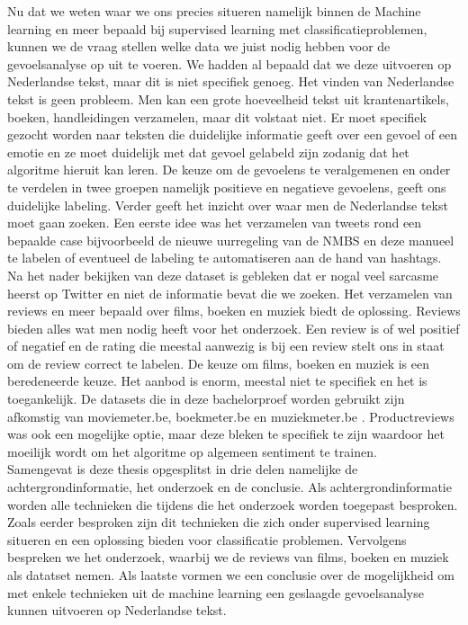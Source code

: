 Nu dat we weten waar we ons precies situeren namelijk binnen de Machine learning en meer bepaald bij supervised learning met classificatieproblemen, kunnen we de vraag stellen welke data we juist nodig hebben voor de gevoelsanalyse op uit te voeren. We hadden al bepaald dat we deze uitvoeren op Nederlandse tekst, maar dit is niet specifiek genoeg. Het vinden van Nederlandse tekst is geen probleem. Men kan een grote hoeveelheid tekst uit krantenartikels, boeken, handleidingen verzamelen, maar dit volstaat niet. Er moet specifiek gezocht worden naar teksten die duidelijke informatie geeft over een gevoel of een emotie en ze moet duidelijk met dat gevoel gelabeld zijn zodanig dat het algoritme hieruit kan leren. De keuze om de gevoelens te veralgemenen en onder te verdelen in twee groepen namelijk positieve en negatieve gevoelens, geeft ons duidelijke labeling. Verder geeft het inzicht over waar men de Nederlandse tekst moet gaan zoeken. Een eerste idee was het verzamelen van tweets rond een bepaalde case bijvoorbeeld de nieuwe uurregeling van de NMBS en deze manueel te labelen of eventueel de labeling te automatiseren aan de hand van hashtags. Na het nader bekijken van deze dataset is gebleken dat er nogal veel sarcasme heerst op Twitter en niet de informatie bevat die we zoeken. Het verzamelen van reviews en meer bepaald over films, boeken en muziek biedt de oplossing. Reviews bieden alles wat men nodig heeft voor het onderzoek. Een review is of wel positief of negatief en de rating die meestal aanwezig is bij een review stelt ons in staat om de review correct te labelen. De keuze om films, boeken en muziek is een beredeneerde keuze. Het aanbod is enorm, meestal niet te specifiek en het is toegankelijk. De datasets die in deze bachelorproef worden gebruikt zijn afkomstig van moviemeter.be, boekmeter.be en muziekmeter.be . Productreviews was ook een mogelijke optie, maar deze bleken te specifiek te zijn waardoor het moeilijk wordt om het algoritme op algemeen sentiment te trainen. \\  
%
Samengevat is deze thesis opgesplitst in drie delen namelijke de achtergrondinformatie, het onderzoek en de conclusie. Als achtergrondinformatie worden alle technieken die tijdens die het onderzoek worden toegepast besproken. Zoals eerder besproken zijn dit technieken die zich onder supervised learning situeren en een oplossing bieden voor classificatie problemen. Vervolgens bespreken we het onderzoek, waarbij we  de reviews van films, boeken en muziek als datatset nemen. Als laatste vormen we een conclusie over de mogelijkheid om met enkele technieken uit de machine learning een geslaagde gevoelsanalyse kunnen uitvoeren op Nederlandse tekst.  
